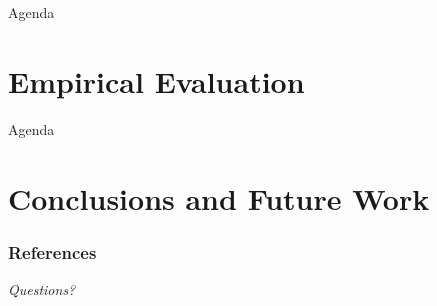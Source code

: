 \documentclass{beamer}
\begin{document}
  

  \begin{frame}{Agenda}
    \section{Empirical Evaluation}
    \tableofcontents[currentsection]
  \end{frame}

  


  \begin{frame}{Agenda}
    \section{Conclusions and Future Work}
    \tableofcontents[currentsection]
  \end{frame}

  

  \begin{frame}[allowframebreaks]
    \frametitle{References}
    
    
  \end{frame}

  \begin{frame}
    \centering \Huge
    \emph{Questions?}
  \end{frame}  
  
\end{document}
